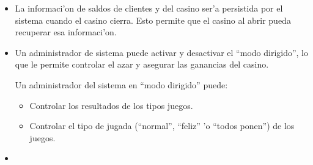 \begin{itemize}
\item {} 

    La informaci'on de saldos de clientes y del casino ser'a persistida por el sistema cuando el casino cierra. Esto permite que el casino al abrir pueda recuperar esa informaci'on.

\end{itemize}

\clearpage


\begin{itemize}

\item {}

    Un administrador de sistema puede activar y desactivar el ``modo dirigido'', lo que le permite controlar el azar y asegurar las ganancias del casino.

    Un administrador del sistema en ``modo dirigido'' puede:
    \begin{itemize}
        \item Controlar los resultados de los tipos juegos.
        \item Controlar el tipo de jugada (``normal'', ``feliz'' 'o ``todos ponen'') de los juegos.
    \end{itemize}

\item {}


\end{itemize}
